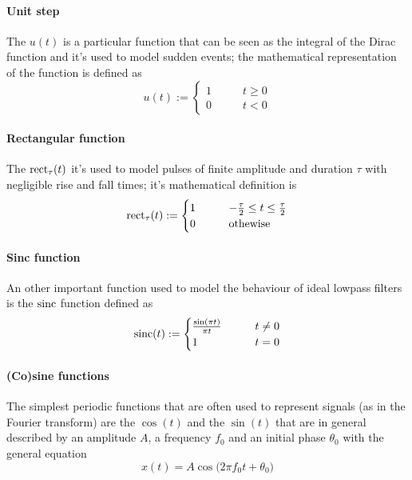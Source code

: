 	\paragraph{Unit step} The  $u(t)$ is a particular function that can be seen as the integral of the Dirac function and it's used to model sudden events; the mathematical representation of the function is defined as
	\begin{equation} \label{eq:intro:unitstep}
		u(t) := \begin{cases}
			1 \qquad & t \geq 0 \\
			0 \qquad & t < 0
		\end{cases}
	\end{equation}

	\paragraph{Rectangular function} The  $\textrm{rect}_\tau(t)$ it's used to model pulses of finite amplitude and duration $\tau$ with negligible rise and fall times; it's mathematical definition is
	\begin{equation} \label{eq:intro:rect}
		\textrm{rect}_\tau (t) := \begin{cases}
			1 \qquad & -\frac \tau2 \leq t \leq \frac \tau 2 \\
			0 & \textrm{othewise}
		\end{cases}
	\end{equation}

	\paragraph{Sinc function} An other important function used to model the behaviour of ideal lowpass filters is the  $\textrm{sinc}$ function defined as
	\begin{equation}
		\textrm{sinc}(t) := \begin{cases}
			\frac{\sin(\pi t)}{\pi t} \qquad & t \neq 0 \\
			1 & t = 0
		\end{cases}
	\end{equation}

	\paragraph{(Co)sine functions} The simplest periodic functions that are often used to represent signals (as in the Fourier transform) are the  $\cos(t)$ and the  $\sin(t)$ that are in general described by an amplitude $A$, a frequency $f_0$ and an initial phase $\theta_0$ with the general equation
	\begin{equation}
		x(t) = A \cos \big( 2\pi f_0 t + \theta_0 \big)
	\end{equation}

